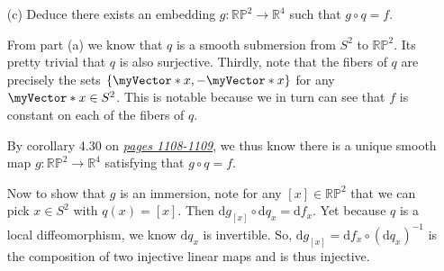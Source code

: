 \documentclass{book}
\newcommand{\inLinkRap}[2]{{\color{blue}\hyperlink{#1}{\textit{#2}}}}
\newcommand{\HexOne}{%
   \color{Purple}%
   \fontsize{12}{13}\selectfont%
}
\newenvironment{myIndent}{%
   \begin{adjustwidth}{2.5em}{0em}%
}{%
   \end{adjustwidth}%
}
\newcommand{\df}{\mathrm{d}}
\newcommand{\Df}{\mathrm{D}}
\newcommand{\retTwo}{\hfill\bigbreak}
\newcommand{\mVecAst}[1]{\myVector*{#1}}
\begin{document}
\begin{enumerate}
\begin{myIndent}
		In other words, the only points of $S^2$ where $\Df F$ is not full rank are $(0, 0, 1)$\\ and $(0, 0, -1)$. Since a composition of injective linear maps is injective, we can\\ thus conclude that $\df f_p$ is injective for all $p \in S^2 - \{(0, 0, 1), (0, 0, -1)\}$.\retTwo

		As for showing that $\df f_{(0, 0, \pm 1)}$ is injective, we need to show that:
		
		{\centering$T_{(0, 0, \pm 1)} S^2 \cap \ker(\df F_{(0, 0, \pm 1)}) = \{0\}$.\retTwo\par}

		Fortunately, $S^2$ is regular zero set of $\Phi: \mathbb{R}^{3} \to \mathbb{R}$ given by $\Phi(x) = |x|^2 - 1$. Therefore:

		{\centering $T_{(0, 0, \pm 1)} S^2 = \ker(\Df \Phi(0, 0, \pm 1)) = \ker(\begin{bmatrix} 0 & 0 & \pm 2\end{bmatrix}) = \mathbb{R}^2 \times \{0\}$ \retTwo\par}

		Meanwhile, $\ker(\df F_{(0, 0, \pm 1)}) = \ker\left(\begin{bmatrix} 0 & 0 & 0 \\ 0 & 0 & 0 \\ \pm 1 & 0 & 0 \\ 0 & \pm 1 & 0\end{bmatrix}\right) = \{(0, 0)\} \times \mathbb{R}$.\retTwo
	\end{myIndent}

	\item[(c)] Deduce there exists an embedding $g: \mathbb{RP}^2 \to \mathbb{R}^4$ such that $g \circ q = f$.\newpage
	\begin{myIndent}\HexOne
		From part (a) we know that $q$ is a smooth submersion from $S^2$ to $\mathbb{RP}^2$. Its pretty trivial that $q$ is also surjective. Thirdly, note that the fibers of $q$ are precisely the sets $\{\mVecAst{x}, -\mVecAst{x}\}$ for any $\mVecAst{x} \in S^2$. This is notable because we in turn can see that $f$ is constant on each of the fibers of $q$.\retTwo

		By corollary 4.30 on \inLinkRap{Corollary 4.30 page 1109}{pages 1108-1109}, we thus know there is a unique smooth map $g: \mathbb{RP}^2 \to \mathbb{R}^4$ satisfying that $g \circ q = f$.\retTwo
		
		Now to show that $g$ is an immersion, note for any $[x] \in \mathbb{RP}^2$ that we can pick $x \in S^2$ with $q(x) = [x]$. Then $\df g_{[x]} \circ \df q_x = \df f_x$. Yet because $q$ is a local diffeomorphism, we know  $\df q_x$ is invertible. So, $\df g_{[x]} = \df f_x \circ (\df q_x)^{-1}$ is the composition of two injective linear maps and is thus injective.\retTwo


\end{myIndent}
\end{enumerate}
\end{document}
